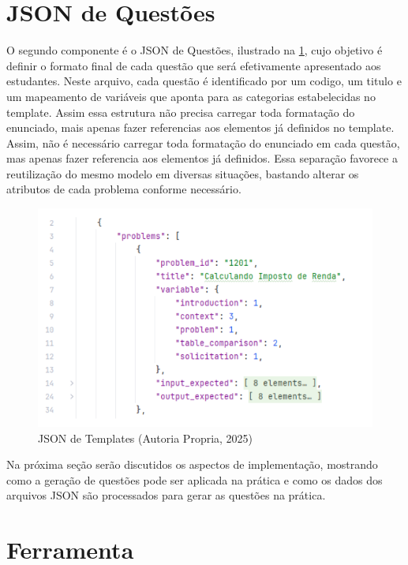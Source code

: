 \section{JSON de Questões}

O segundo componente é o JSON de Questões, ilustrado na \ref{fig:json-de-questoes}, cujo objetivo é definir o formato final de cada questão que será efetivamente apresentado aos estudantes. Neste arquivo, cada questão é identificado por um codigo, um titulo e um mapeamento de variáveis que aponta para as categorias estabelecidas no template. Assim essa estrutura não precisa carregar toda formatação do enunciado, mais apenas fazer referencias aos elementos já definidos no template. Assim, não é necessário carregar toda formatação do enunciado em cada questão, mas apenas fazer referencia aos elementos já definidos. Essa separação favorece a reutilização do mesmo modelo em diversas situações, bastando alterar os atributos de cada problema conforme necessário.

\begin{figure}[ht]
	\centering
	\includegraphics[width=14cm]{./imagens/capitulo7/json-de-questoes}
	\caption{JSON de Templates (Autoria Propria, 2025) }
	\label{fig:json-de-questoes}
\end{figure}
Na próxima seção serão discutidos os aspectos de implementação, mostrando como a geração de questões pode ser aplicada na prática e como os dados dos arquivos JSON são processados para gerar  as questões na prática.

\section{Ferramenta}

